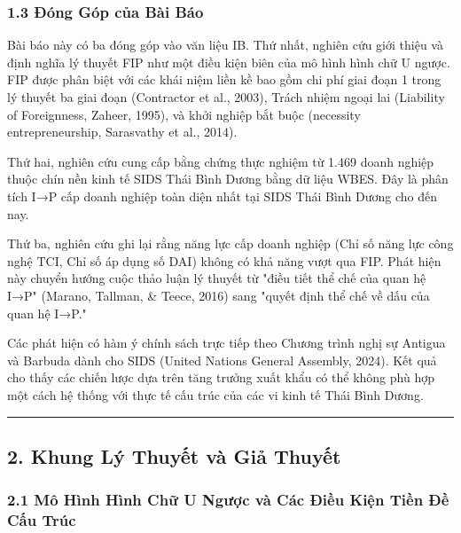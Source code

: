 \documentclass[12pt,a4paper]{article}
\begin{document}
\hypertarget{13-ux111uxf3ng-guxf3p-cux1ee7a-buxe0i-buxe1o}{%
\subsubsection{1.3 Đóng Góp của Bài
Báo}\label{13-ux111uxf3ng-guxf3p-cux1ee7a-buxe0i-buxe1o}}

Bài báo này có ba đóng góp vào văn liệu IB. Thứ nhất, nghiên cứu giới
thiệu và định nghĩa lý thuyết FIP như một điều kiện biên của mô hình
hình chữ U ngược. FIP được phân biệt với các khái niệm liền kề bao gồm
chi phí giai đoạn 1 trong lý thuyết ba giai đoạn (Contractor et al.,
2003), Trách nhiệm ngoại lai (Liability of Foreignness, Zaheer, 1995),
và khởi nghiệp bắt buộc (necessity entrepreneurship, Sarasvathy et al.,
2014).

Thứ hai, nghiên cứu cung cấp bằng chứng thực nghiệm từ 1.469 doanh
nghiệp thuộc chín nền kinh tế SIDS Thái Bình Dương bằng dữ liệu WBES.
Đây là phân tích I→P cấp doanh nghiệp toàn diện nhất tại SIDS Thái Bình
Dương cho đến nay.

Thứ ba, nghiên cứu ghi lại rằng năng lực cấp doanh nghiệp (Chỉ số năng
lực công nghệ TCI, Chỉ số áp dụng số DAI) không có khả năng vượt qua
FIP. Phát hiện này chuyển hướng cuộc thảo luận lý thuyết từ "điều tiết
thể chế của quan hệ I→P" (Marano, Tallman, \& Teece, 2016) sang "quyết
định thể chế về dấu của quan hệ I→P."

Các phát hiện có hàm ý chính sách trực tiếp theo Chương trình nghị sự
Antigua và Barbuda dành cho SIDS (United Nations General Assembly,
2024). Kết quả cho thấy các chiến lược dựa trên tăng trưởng xuất khẩu có
thể không phù hợp một cách hệ thống với thực tế cấu trúc của các vi kinh
tế Thái Bình Dương.

\begin{center}\rule{0.5\linewidth}{0.5pt}\end{center}

\hypertarget{2-khung-luxfd-thuyux1ebft-vuxe0-giux1ea3-thuyux1ebft}{%
\subsection{2. Khung Lý Thuyết và Giả
Thuyết}\label{2-khung-luxfd-thuyux1ebft-vuxe0-giux1ea3-thuyux1ebft}}

\hypertarget{21-muxf4-huxecnh-huxecnh-chux1eef-u-ngux1b0ux1ee3c-vuxe0-cuxe1c-ux111iux1ec1u-kiux1ec7n-tiux1ec1n-ux111ux1ec1-cux1ea5u-truxfac}{%
\subsubsection{2.1 Mô Hình Hình Chữ U Ngược và Các Điều Kiện Tiền Đề Cấu
Trúc}\label{21-muxf4-huxecnh-huxecnh-chux1eef-u-ngux1b0ux1ee3c-vuxe0-cuxe1c-ux111iux1ec1u-kiux1ec7n-tiux1ec1n-ux111ux1ec1-cux1ea5u-truxfac}}
\end{document}
